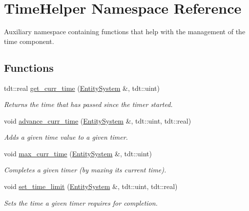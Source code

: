 \hypertarget{namespace_time_helper}{}\section{Time\+Helper Namespace Reference}
\label{namespace_time_helper}


Auxiliary namespace containing functions that help with the management of the time component.  


\subsection*{Functions}
\begin{DoxyCompactItemize}
\item 
tdt\+::real \hyperlink{namespace_time_helper_a15eab267c80aa38315ffe39aa7d2a429}{get\+\_\+curr\+\_\+time} (\hyperlink{class_entity_system}{Entity\+System} \&, tdt\+::uint)
\begin{DoxyCompactList}\small\item\em Returns the time that has passed since the timer started. \end{DoxyCompactList}\item 
void \hyperlink{namespace_time_helper_a4cafe865b0edb09354faa68d44f9ca9c}{advance\+\_\+curr\+\_\+time} (\hyperlink{class_entity_system}{Entity\+System} \&, tdt\+::uint, tdt\+::real)
\begin{DoxyCompactList}\small\item\em Adds a given time value to a given timer. \end{DoxyCompactList}\item 
void \hyperlink{namespace_time_helper_ade17d2a03be5d9be7801c6d07cbf6878}{max\+\_\+curr\+\_\+time} (\hyperlink{class_entity_system}{Entity\+System} \&, tdt\+::uint)
\begin{DoxyCompactList}\small\item\em Completes a given timer (by maxing it\textquotesingle{}s current time). \end{DoxyCompactList}\item 
void \hyperlink{namespace_time_helper_ae6205e873a275707a830487f263efe45}{set\+\_\+time\+\_\+limit} (\hyperlink{class_entity_system}{Entity\+System} \&, tdt\+::uint, tdt\+::real)
\begin{DoxyCompactList}\small\item\em Sets the time a given timer requires for completion. \end{DoxyCompactList}\item 

\end{DoxyCompactItemize}
